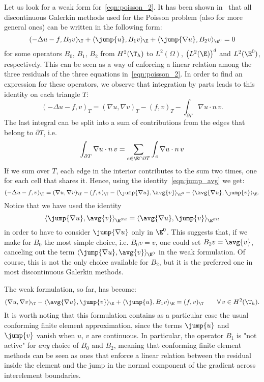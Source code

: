 Let us look for a weak form for~\eqref{eqn:poisson_2}. It has been shown in~\cite{bcms04} that all discontinuous Galerkin methods used for the Poisson problem (also for more general ones) can be written in the following form:
\[
(-\Delta u - f, B_0 v)_\T + \langle \jump{u}, B_1 v \rangle_\E + \langle \jump{\nabla u}, B_2 v \rangle_{\E^0} = 0
\]
for some operators $B_0$, $B_1$, $B_2$ from $H^2(\T_h)$ to $L^2(\Omega)$, $\bigl(L^2(\E)\bigr)^d$ and $L^2(\E^0)$, respectively. This can be seen as a way of enforcing a linear relation among the three residuals of the three equations in~\eqref{eqn:poisson_2}. In order to find an expression for these operators, we observe that integration by parts leads to this identity on each triangle $T$:
\[
(- \Delta u - f , v )_T = (\nabla u, \nabla v)_T - (f,v)_T - \int_{\partial T} \nabla u \cdot n \,v.
\]
The last integral can be split into a sum of contributions from the edges that belong to $\partial T$, i.e.
\[
\int_{\partial T} \nabla u \cdot n \,v = \sum_{e \in \E \cap \partial T} \int_{e} \nabla u \cdot n \,v
\]
If we sum over $T$, each edge in the interior contributes to the sum two times, one for each cell that shares it. Hence, using the identity~\eqref{eqn:jump_avg} we get:
\[
(- \Delta u - f , v )_\T = (\nabla u, \nabla v)_\T - (f,v)_\T -
\langle \jump{\nabla u}, \avg{v} \rangle_{\E^0} -
\langle \avg{\nabla u}, \jump{v} \rangle_{\E}.
\]
Notice that we have used the identity
\[
\langle \jump{\nabla u}, \avg{v} \rangle_{\E^{\partial\Omega}}
= \langle \avg{\nabla u}, \jump{v} \rangle_{\E^{\partial\Omega}}
\]
in order to have to consider $\jump{\nabla u}$ only in $\E^0$. This suggests that, if we make for $B_0$ the most simple choice, i.e. $B_0 v = v$, one could set $B_2 v = \avg{v}$, canceling out the term $\langle \jump{\nabla u}, \avg{v} \rangle_{\E^0}$ in the weak formulation. Of course, this is not the only choice available for $B_2$, but it is the preferred one in most discontinuous Galerkin methods.

The weak formulation, so far, has become:
\[
(\nabla u, \nabla v)_\T -
\langle \avg{\nabla u}, \jump{v} \rangle_{\E} + 
\langle \jump{u}, B_1 v \rangle_\E = (f,v)_\T \qquad \forall \, v \in H^2(\T_h).
\]
It is worth noting that this formulation contains as a particular case the usual conforming finite element approximation, since the terms $\jump{u}$ and $\jump{v}$ vanish when $u$, $v$ are continuous. In particular, the operator $B_1$ is "not active" for \emph{any} choice of $B_0$ and $B_2$, meaning that conforming ﬁnite element methods can be seen as ones that enforce a linear relation between the residual inside the element and the jump in the normal component of the gradient across interelement boundaries.

